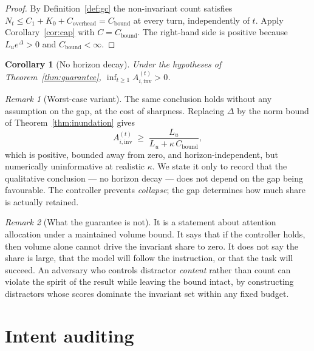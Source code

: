 \documentclass[11pt,a4paper]{article}
\theoremstyle{plain}
\newtheorem{corollary}{Corollary}
\theoremstyle{definition}
\theoremstyle{remark}
\newtheorem{remark}{Remark}
\newcommand{\Ainv}{A_{i,\mathrm{inv}}}
\begin{document}
\begin{proof}
By Definition~\ref{def:gc} the non-invariant count satisfies
$N_t \le C_1 + K_0 + C_{\mathrm{overhead}} = C_{\mathrm{bound}}$ at every turn,
independently of $t$. Apply Corollary~\ref{cor:cap} with $C = C_{\mathrm{bound}}$.
The right-hand side is positive because $L_u e^{\Delta} > 0$ and
$C_{\mathrm{bound}} < \infty$.
\end{proof}

\begin{corollary}[No horizon decay]
\label{cor:no-decay}
Under the hypotheses of Theorem~\ref{thm:guarantee},
$\inf_{t\ge1} \Ainv^{(t)} > 0$.
\end{corollary}

\begin{remark}[Worst-case variant]
The same conclusion holds without any assumption on the gap, at the cost of
sharpness. Replacing $\Delta$ by the norm bound of
Theorem~\ref{thm:inundation} gives
\begin{equation}
  \Ainv^{(t)} \;\ge\; \frac{L_u}{L_u + \kappa\, C_{\mathrm{bound}}},
\end{equation}
which is positive, bounded away from zero, and horizon-independent, but
numerically uninformative at realistic $\kappa$. We state it only to record that
the qualitative conclusion --- no horizon decay --- does not depend on the gap
being favourable. The controller prevents \emph{collapse}; the gap determines
how much share is actually retained.
\end{remark}

\begin{remark}[What the guarantee is not]
It is a statement about attention allocation under a maintained volume bound. It
says that if the controller holds, then volume alone cannot drive the invariant
share to zero. It does not say the share is large, that the model will follow the
instruction, or that the task will succeed. An adversary who controls distractor
\emph{content} rather than count can violate the spirit of the result while
leaving the bound intact, by constructing distractors whose scores dominate the
invariant set within any fixed budget.
\end{remark}

\section{Intent auditing}
\label{sec:cic}
\end{document}
